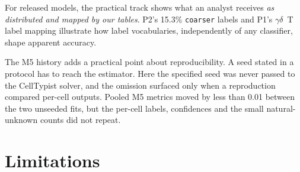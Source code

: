 \documentclass[11pt]{article}
\newcommand{\gd}{$\gamma\delta$~T}
\begin{document}
For released models, the practical track shows what an analyst receives \emph{as distributed and mapped by our tables}. P2's 15.3\% \texttt{coarser} labels and P1's \gd{} label mapping illustrate how label vocabularies, independently of any classifier, shape apparent accuracy.

The M5 history adds a practical point about reproducibility. A seed stated in a protocol has to reach the estimator. Here the specified seed was never passed to the CellTypist solver, and the omission surfaced only when a reproduction compared per-cell outputs. Pooled M5 metrics moved by less than 0.01 between the two unseeded fits, but the per-cell labels, confidences and the small natural-unknown counts did not repeat.

\section{Limitations}\label{sec:limits}
\end{document}
